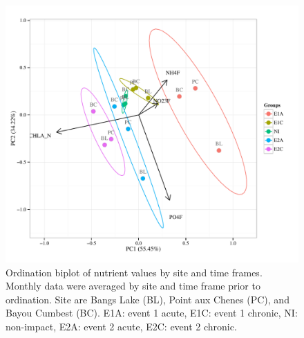 \documentclass[letterpaper,12pt]{article}\usepackage[]{graphicx}\usepackage[]{color}
\makeatletter
\def\maxwidth{ %
  \ifdim\Gin@nat@width>\linewidth
    \linewidth
  \else
    \Gin@nat@width
  \fi
}
\makeatother
\begin{document}
\begin{figure}[!ht]

{\centering \includegraphics[width=\maxwidth]{figs/pcafig-1} 

}

\caption[Ordination biplot of nutrient values by site and time frames]{Ordination biplot of nutrient values by site and time frames. Monthly data were averaged by site and time frame prior to ordination.  Site are Bangs Lake (BL), Point aux Chenes (PC), and Bayou Cumbest (BC). E1A: event 1 acute, E1C: event 1 chronic, NI: non-impact, E2A: event 2 acute, E2C: event 2 chronic.}\label{fig:pcafig}
\end{figure}


\clearpage
\end{document}
